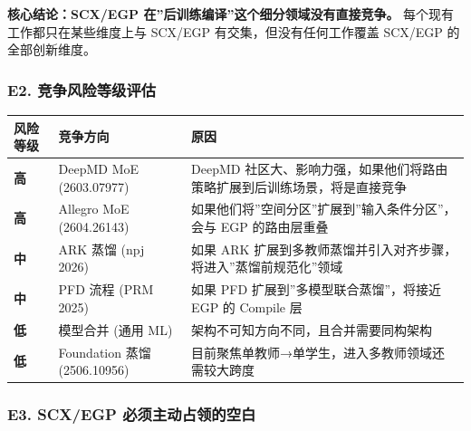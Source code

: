 \documentclass[
  12pt,
]{ctexart}
\begin{document}
\textbf{核心结论：SCX/EGP 在''后训练编译''这个细分领域没有直接竞争。}
每个现有工作都只在某些维度上与 SCX/EGP 有交集，但没有任何工作覆盖
SCX/EGP 的全部创新维度。

\subsubsection{E2.
竞争风险等级评估}\label{e2.-ux7adeux4e89ux98ceux9669ux7b49ux7ea7ux8bc4ux4f30}

\begin{longtable}[]{@{}
  >{\centering\arraybackslash}p{}
  >{\raggedright\arraybackslash}p{}
  >{\raggedright\arraybackslash}p{}@{}}
\toprule\noalign{}
\begin{minipage}[b]{\linewidth}\centering
风险等级
\end{minipage} & \begin{minipage}[b]{\linewidth}\raggedright
竞争方向
\end{minipage} & \begin{minipage}[b]{\linewidth}\raggedright
原因
\end{minipage} \\
\midrule\noalign{}
\endhead
\bottomrule\noalign{}
\endlastfoot
\textbf{高} & DeepMD MoE (2603.07977) & DeepMD
社区大、影响力强，如果他们将路由策略扩展到后训练场景，将是直接竞争 \\
\textbf{高} & Allegro MoE (2604.26143) &
如果他们将''空间分区''扩展到''输入条件分区''，会与 EGP 的路由层重叠 \\
\textbf{中} & ARK 蒸馏 (npj 2026) & 如果 ARK
扩展到多教师蒸馏并引入对齐步骤，将进入''蒸馏前规范化''领域 \\
\textbf{中} & PFD 流程 (PRM 2025) & 如果 PFD
扩展到''多模型联合蒸馏''，将接近 EGP 的 Compile 层 \\
\textbf{低} & 模型合并 (通用 ML) &
架构不可知方向不同，且合并需要同构架构 \\
\textbf{低} & Foundation 蒸馏 (2506.10956) &
目前聚焦单教师→单学生，进入多教师领域还需较大跨度 \\
\end{longtable}

\subsubsection{E3. SCX/EGP
必须主动占领的空白}\label{e3.-scxegp-ux5fc5ux987bux4e3bux52a8ux5360ux9886ux7684ux7a7aux767d}
\end{document}
